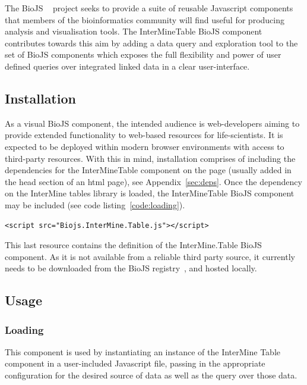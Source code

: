 \documentclass[10pt,a4paper,twocolumn]{article}
\begin{document}
The BioJS ~\cite{biojs} project seeks to provide a suite of reusable Javascript
components that members of the bioinformatics community will find useful for
producing analysis and visualisation tools. The InterMineTable BioJS component
contributes towards this aim by adding a data query and exploration tool to the
set of BioJS components which exposes the full flexibility and power of user
defined queries over integrated linked data in a clear user-interface.

\subsection*{Installation}

As a visual BioJS component, the intended audience is web-developers aiming to
provide extended functionality to web-based resources for life-scientists. It is
expected to be deployed within modern browser environments with access to third-party
resources. With this in mind, installation comprises of including the dependencies for
the InterMineTable component on the page (usually added in the head section
of an html page), see Appendix~\ref{sec:deps}. Once the dependency on the InterMine 
tables library is loaded, the InterMineTable BioJS component may be included (see 
code listing~\ref{code:loading}).

\begin{lstlisting}[caption={Loading the BioJS InterMine Table library}, label={code:loading}]
<script src="Biojs.InterMine.Table.js"></script>
\end{lstlisting}

This last resource contains the definition of the InterMine.Table BioJS
component. As it is not available from a reliable third party source, it
currently needs to be downloaded from the BioJS
registry~\cite{site:biojs-registry}, and hosted locally.

\subsection*{Usage}

\subsubsection*{Loading}

This component is used by instantiating an instance of the InterMine Table
component in a user-included Javascript file, passing in the appropriate
configuration for the desired source of data as well as the query over those
data.
\end{document}
